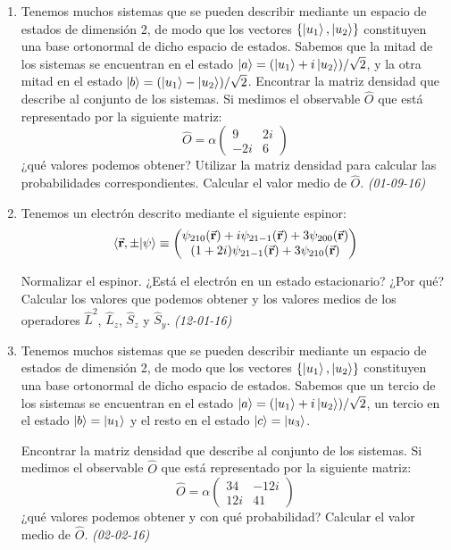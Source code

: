 \begin{enumerate}
    \item Tenemos muchos sistemas que se pueden describir mediante un espacio de estados de dimensión 2, de modo que los vectores $\{\ket{u_1}, \ket{u_2}\}$ constituyen una base ortonormal de dicho espacio de estados. Sabemos que la mitad de los sistemas se encuentran en el estado $\ket{a} = (\ket{u_1} + i \ket{u_2}) / \sqrt{2}$, y la otra mitad en el estado $\ket{b} = (\ket{u_1} - \ket{u_2}) / \sqrt{2}$. Encontrar la matriz densidad que describe al conjunto de los sistemas. Si medimos el observable $\hat{O}$ que está representado por la siguiente matriz:
    \[
    \hat{O} = \alpha \begin{pmatrix} 9 & 2i \\ -2i & 6 \end{pmatrix}
    \]
    ¿qué valores podemos obtener? Utilizar la matriz densidad para calcular las probabilidades correspondientes. Calcular el valor medio de $\hat{O}$.  \textit{(01-09-16)}

    \item Tenemos un electrón descrito mediante el siguiente espinor:
    \[
    \langle \va{r}, \pm | \psi \rangle \equiv 
    \begin{pmatrix}
    \psi_{210}(\va{r}) + i \psi_{21-1}(\va{r}) + 3 \psi_{200}(\va{r}) \\
    (1 + 2i) \psi_{21-1}(\va{r}) + 3 \psi_{210}(\va{r})
    \end{pmatrix}
    \]
    
    Normalizar el espinor. ¿Está el electrón en un estado estacionario? ¿Por qué? Calcular los valores que podemos obtener y los valores medios de los operadores \( \hat{L}^2 \), \( \hat{L}_z \), \( \hat{S}_z \) y \( \hat{S}_y \). \textit{(12-01-16)}

    \item Tenemos muchos sistemas que se pueden describir mediante un espacio de estados de dimensión 2, de modo que los vectores $\{\ket{u_1}, \ket{u_2}\}$ constituyen una base ortonormal de dicho espacio de estados. Sabemos que un tercio de los sistemas se encuentran en el estado $\ket{a} = (\ket{u_1} + i \ket{u_2}) / \sqrt{2}$, un tercio en el estado $\ket{b} = \ket{u_1}$ y el resto en el estado $\ket{c} = \ket{u_3}$. 

    Encontrar la matriz densidad que describe al conjunto de los sistemas. Si medimos el observable $\hat{O}$ que está representado por la siguiente matriz:
    \[
    \hat{O} = \alpha \begin{pmatrix} 34 & -12i \\ 12i & 41 \end{pmatrix}
    \]
    ¿qué valores podemos obtener y con qué probabilidad? Calcular el valor medio de $\hat{O}$. \textit{(02-02-16)}


\end{enumerate}
